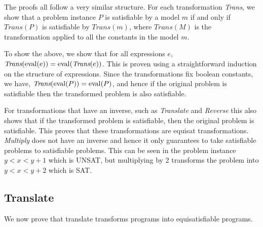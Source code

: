 The proofs all follow a very similar structure. For each transformation
\textit{Trans}, we show that a problem instance $P$ is satisfiable by a model $m$
if and only if $\textit{Trans}(P)$ is satisfiable by $\textit{Trans}(m)$, where
$\textit{Trans}(M)$ is the transformation applied to all the constants in the
model $m$.

To show the above, we show that for all expressions $e$, $\textit{Trans}(\operatorname{eval}
(e)) = \operatorname{eval} (\textit{Trans}(e))$. This is proven using a straightforward
induction on the structure of expressions. Since the transformations fix
boolean constants, we have, $\textit{Trans}(\operatorname{eval} (P)) = \operatorname{eval} (P)$, and hence
if the original problem is satisfiable then the transformed problem is also
satisfiable.

For transformations that have an inverse, such as \textit{Translate}
and \textit{Reverse} this also shows that if the transformed problem is
satisfiable, then the original problem is satisfiable. This proves that these
transformations are equisat transformations. \textit{Multiply} does not have an
inverse and hence it only guarantees to take satisfiable problems to satisfiable
problems. This can be seen in the problem instance $y<x<y+1$ which is UNSAT, but
multiplying by 2 transforms the problem into $y<x<y+2$ which is SAT.

\subsection{Translate}
We now prove that translate transforms programs into equisatisfiable programs.
